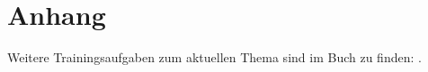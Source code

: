 
\newpage
\appendix

\section{Anhang}





Weitere Trainingsaufgaben zum aktuellen Thema sind im Buch zu finden:
.
